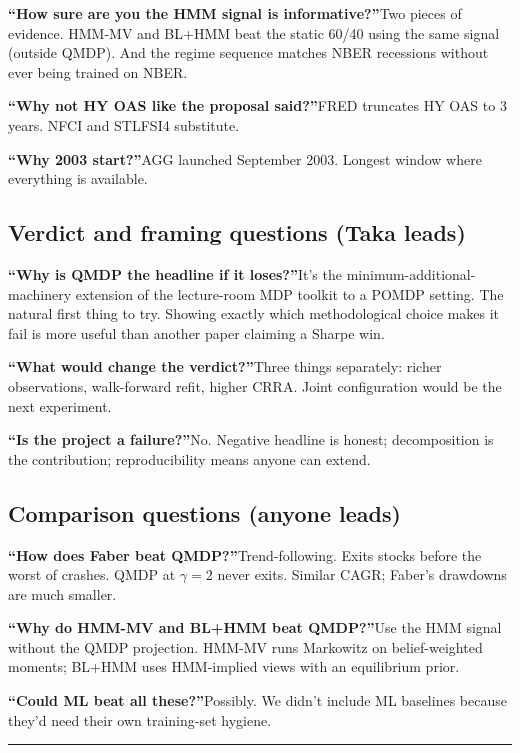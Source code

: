 \documentclass[11pt]{article}
\begin{document}
\textbf{``How sure are you the HMM signal is informative?''}\quad Two pieces of evidence. HMM-MV and BL+HMM beat the static 60/40 using the same signal (outside QMDP). And the regime sequence matches NBER recessions without ever being trained on NBER.

\textbf{``Why not HY OAS like the proposal said?''}\quad FRED truncates HY OAS to 3 years. NFCI and STLFSI4 substitute.

\textbf{``Why 2003 start?''}\quad AGG launched September 2003. Longest window where everything is available.

\subsection*{Verdict and framing questions (Taka leads)}

\textbf{``Why is QMDP the headline if it loses?''}\quad It's the minimum-additional-machinery extension of the lecture-room MDP toolkit to a POMDP setting. The natural first thing to try. Showing exactly which methodological choice makes it fail is more useful than another paper claiming a Sharpe win.

\textbf{``What would change the verdict?''}\quad Three things separately: richer observations, walk-forward refit, higher CRRA. Joint configuration would be the next experiment.

\textbf{``Is the project a failure?''}\quad No. Negative headline is honest; decomposition is the contribution; reproducibility means anyone can extend.

\subsection*{Comparison questions (anyone leads)}

\textbf{``How does Faber beat QMDP?''}\quad Trend-following. Exits stocks before the worst of crashes. QMDP at $\gamma = 2$ never exits. Similar CAGR; Faber's drawdowns are much smaller.

\textbf{``Why do HMM-MV and BL+HMM beat QMDP?''}\quad Use the HMM signal without the QMDP projection. HMM-MV runs Markowitz on belief-weighted moments; BL+HMM uses HMM-implied views with an equilibrium prior.

\textbf{``Could ML beat all these?''}\quad Possibly. We didn't include ML baselines because they'd need their own training-set hygiene.

\bigskip\hrule

\end{document}
